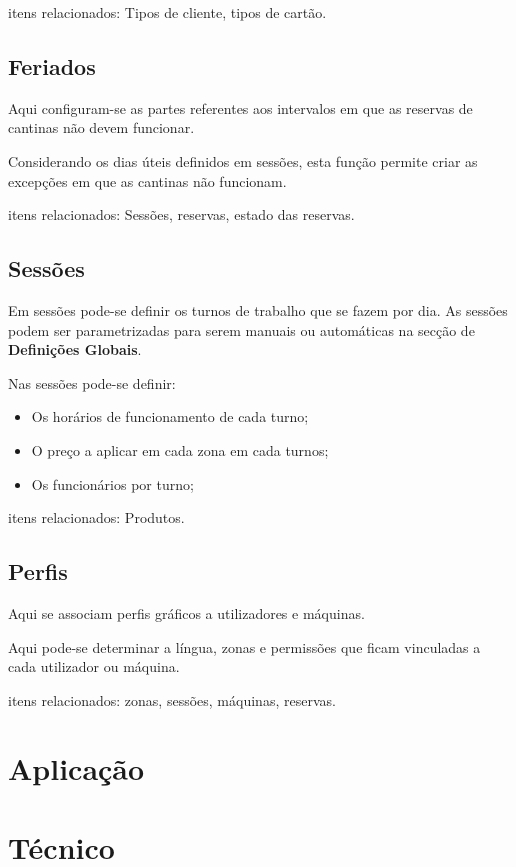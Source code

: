 \documentclass[a4paper,11pt,openany]{memoir}
\begin{document}
itens relacionados: Tipos de cliente, tipos de cartão.

\section{Feriados}

Aqui configuram-se as partes referentes aos intervalos em que as reservas de cantinas não devem funcionar.

Considerando os dias úteis definidos em sessões, esta função permite criar as excepções em que as cantinas não funcionam.

itens relacionados: Sessões, reservas, estado das reservas.

\section{Sessões}
Em sessões pode-se definir os turnos de trabalho que se fazem por dia. As sessões podem ser parametrizadas para serem manuais ou automáticas 
na secção de \textbf{Definições Globais}.

Nas sessões pode-se definir:
\begin{itemize}
\item Os horários de funcionamento de cada turno;
\item O preço a aplicar em cada zona em cada turnos;
\item Os funcionários por turno;
\end{itemize}

itens relacionados: Produtos.


\section{Perfis}

Aqui se associam perfis gráficos a utilizadores e máquinas.

Aqui pode-se determinar a língua, zonas e permissões que ficam vinculadas a cada utilizador ou máquina.

itens relacionados: zonas, sessões, máquinas, reservas.

\chapter{Aplicação}

\chapter{Técnico}
\end{document}
